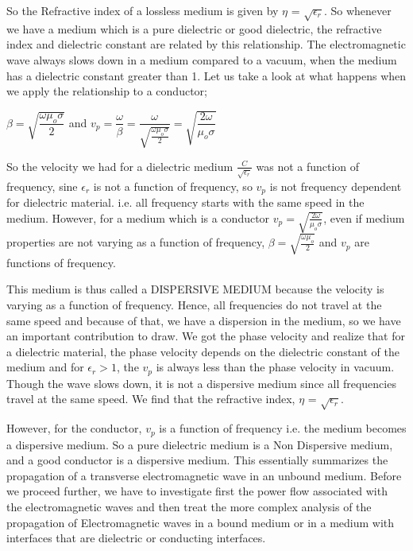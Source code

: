 So the Refractive index of a lossless medium is given by  $\eta$ = $\sqrt{\epsilon_{r}}$. So whenever we have a medium which is a pure dielectric or good dielectric, the refractive index and dielectric constant are related by this relationship. The electromagnetic wave always slows down in a medium compared to a vacuum, when the medium has a dielectric constant greater than 1.
Let us take a look at what happens when we apply the relationship to a conductor;

$\beta=\sqrt{\dfrac{\omega\mu_{o}\sigma}{2}}$  and   $v_p=\dfrac{\omega}{\beta}=\dfrac{\omega}{\sqrt{\frac{\omega\mu_{o}\sigma}{2}}}=\sqrt{\dfrac{2\omega}{\mu_{o}\sigma}}$

So the velocity we had for a dielectric medium $\frac{C}{\sqrt{\epsilon_{r}}}$ was not a function of frequency, sine $\epsilon_{r}$ is not a function of frequency, so $v_p$ is not frequency dependent for dielectric material. i.e. all frequency starts with the same speed in the medium.
However, for a medium which is a conductor $v_p=\sqrt{\frac{2\omega}{\mu_{o}\sigma}}$, even if medium properties are not varying as a function of frequency, $\beta=\sqrt{\frac{\omega\mu_{o}}{2}}$ and $v_p$ are functions of frequency.

This medium is thus called a DISPERSIVE MEDIUM because the velocity is varying as a function of frequency. Hence, all frequencies do not travel at the same speed and because of that, we have a dispersion in the medium, so we have an important contribution to draw.
We got the phase velocity and realize that for a dielectric material, the phase velocity depends on the dielectric constant of the medium and for $\epsilon_{r} > 1$, the $v_p$ is always less than the phase velocity in vacuum. Though the wave slows down, it is not a dispersive medium since all frequencies travel at the same speed. We find that the refractive index, $\eta$ = $\sqrt{\epsilon_{r}}$.

However, for the conductor, $v_p$ is a function of frequency i.e. the medium becomes a dispersive medium. So a pure dielectric medium is a Non Dispersive medium, and a good conductor is a dispersive medium. This essentially summarizes the propagation of a transverse electromagnetic wave in an unbound medium. Before we proceed further, we have to investigate first the power flow associated with the electromagnetic waves and then treat the more complex analysis of the propagation of Electromagnetic waves in a bound medium or in a medium with interfaces that are dielectric or conducting interfaces.
